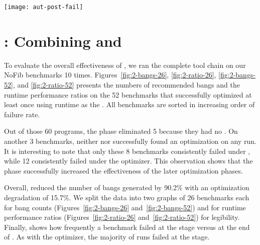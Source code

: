 \begin{figure*}
\texttt{[image: aut-post-fail]}
\label{fig:post-failures}
\end{figure*}


\section{\At{}: Combining \preopt{} and \postopt{}}

To evaluate the overall effectiveness of \At{}, we ran the complete
tool chain on our NoFib benchmarks 10 times. Figures~\ref{fig:2-bangs-26}, \ref{fig:2-ratio-26}, \ref{fig:2-bangs-52},
and \ref{fig:2-ratio-52} presents the numbers of recommended bangs and
the runtime performance ratios on the 52 benchmarks that \At{}
successfully optimized at least once using runtime as the \profm{}.
All benchmarks are sorted in increasing order of \At{} failure rate.

Out of those 60 programs, the \preopt{} phase eliminated 5 because they had no \hotspots{}.  
On another 3 benchmarks, neither \Ao{} nor \At{}
successfully found an optimization on any run.
It is interesting to note that only these 8
benchmarks consistently failed under \At{}, while 12
consistently failed under the \Postopt{} optimizer.
This observation shows that the \preopt{} phase successfully
increased the effectiveness of the later optimization phases.

Overall, \At{} reduced the number of bangs generated by 90.2\%
with an optimization degradation of 15.7\%.
We split the data into two graphs of 26 benchmarks each for bang counts
(Figures~\ref{fig:2-bangs-26} and~\ref{fig:2-bangs-52})
and for runtime performance ratios
(Figures~\ref{fig:2-ratio-26} and~\ref{fig:2-ratio-52})
for legibility.
Finally,  shows how frequently a benchmark
failed at the \Ao{} stage versus at the end of \At{}. As with
the \postopt{} optimizer, the majority of runs failed at the \Ao{} stage.


